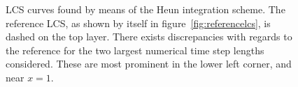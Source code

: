 \begin{figure}[htpb]
    \centering
    
    \caption[LCS curves found by means of the Heun integration scheme]{
        LCS curves found by means of the Heun integration scheme. The
        reference LCS, as shown by itself in figure~\ref{fig:referencelcs},
        is dashed on the top layer. There exists discrepancies with
        regards to the reference for the two largest numerical time step
        lengths considered. These are most prominent in the lower left corner,
        and near $x=1$.}
    \label{fig:lcs_rk2}
\end{figure}
